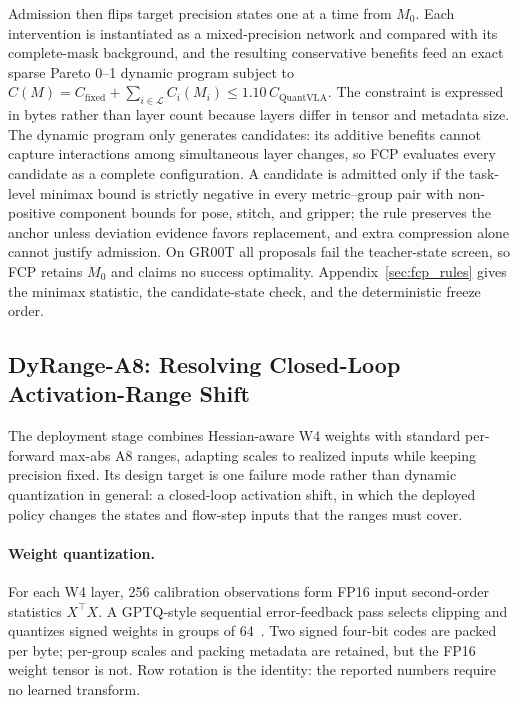Admission then flips target precision states one at a time from $M_0$. Each intervention is instantiated as a mixed-precision network and compared with its complete-mask background, and the resulting conservative benefits feed an exact sparse Pareto 0--1 dynamic program subject to $C(M)=C_{\mathrm{fixed}}+\sum_{i\in\mathcal{L}}C_i(M_i)\le 1.10\,C_{\mathrm{QuantVLA}}$. The constraint is expressed in bytes rather than layer count because layers differ in tensor and metadata size. The dynamic program only generates candidates: its additive benefits cannot capture interactions among simultaneous layer changes, so FCP evaluates every candidate as a complete configuration. A candidate is admitted only if the task-level minimax bound is strictly negative in every metric--group pair with non-positive component bounds for pose, stitch, and gripper; the rule preserves the anchor unless deviation evidence favors replacement, and extra compression alone cannot justify admission. On GR00T all proposals fail the teacher-state screen, so FCP retains $M_0$ and claims no success optimality. Appendix~\ref{sec:fcp_rules} gives the minimax statistic, the candidate-state check, and the deterministic freeze order.

\subsection{DyRange-A8: Resolving Closed-Loop Activation-Range Shift}
\label{sec:deployment}

The deployment stage combines Hessian-aware W4 weights with standard per-forward max-abs A8 ranges, adapting scales to realized inputs while keeping precision fixed. Its design target is one failure mode rather than dynamic quantization in general: a closed-loop activation shift, in which the deployed policy changes the states and flow-step inputs that the ranges must cover.

\paragraph{Weight quantization.}
For each W4 layer, 256 calibration observations form FP16 input second-order statistics $X^\top X$. A GPTQ-style sequential error-feedback pass selects clipping and quantizes signed weights in groups of 64~\citep{frantar2022gptq}. Two signed four-bit codes are packed per byte; per-group scales and packing metadata are retained, but the FP16 weight tensor is not. Row rotation is the identity: the reported numbers require no learned transform.

